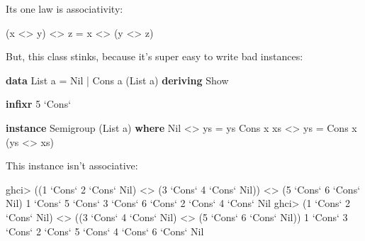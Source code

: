 \documentclass[]{article}
\newenvironment{Shaded}{\begin{snugshade}}{\end{snugshade}}
\newcommand{\DataTypeTok}[1]{\textcolor[rgb]{0.13,0.29,0.53}{#1}}
\newcommand{\DecValTok}[1]{\textcolor[rgb]{0.00,0.00,0.81}{#1}}
\newcommand{\FunctionTok}[1]{\textcolor[rgb]{0.00,0.00,0.00}{#1}}
\newcommand{\KeywordTok}[1]{\textcolor[rgb]{0.13,0.29,0.53}{\textbf{#1}}}
\newcommand{\NormalTok}[1]{#1}
\newcommand{\OtherTok}[1]{\textcolor[rgb]{0.56,0.35,0.01}{#1}}
\begin{document}
Its one law is associativity:

\begin{Shaded}
\begin{Highlighting}[]
\NormalTok{(x }\FunctionTok{<>}\NormalTok{ y) }\FunctionTok{<>}\NormalTok{ z }\FunctionTok{=}\NormalTok{ x }\FunctionTok{<>}\NormalTok{ (y }\FunctionTok{<>}\NormalTok{ z)}
\end{Highlighting}
\end{Shaded}

But, this class stinks, because it's super easy to write bad instances:

\begin{Shaded}
\begin{Highlighting}[]
\KeywordTok{data} \DataTypeTok{List}\NormalTok{ a }\FunctionTok{=} \DataTypeTok{Nil} \FunctionTok{|} \DataTypeTok{Cons}\NormalTok{ a (}\DataTypeTok{List}\NormalTok{ a)}
    \KeywordTok{deriving} \DataTypeTok{Show}

\KeywordTok{infixr} \DecValTok{5} \OtherTok{`Cons`}

\KeywordTok{instance} \DataTypeTok{Semigroup}\NormalTok{ (}\DataTypeTok{List}\NormalTok{ a) }\KeywordTok{where}
    \DataTypeTok{Nil}       \FunctionTok{<>}\NormalTok{ ys }\FunctionTok{=}\NormalTok{ ys}
    \DataTypeTok{Cons}\NormalTok{ x xs }\FunctionTok{<>}\NormalTok{ ys }\FunctionTok{=} \DataTypeTok{Cons}\NormalTok{ x (ys }\FunctionTok{<>}\NormalTok{ xs)}
\end{Highlighting}
\end{Shaded}

This instance isn't associative:

\begin{Shaded}
\begin{Highlighting}[]
\NormalTok{ghci}\FunctionTok{>}\NormalTok{ ((}\DecValTok{1} \OtherTok{`Cons`} \DecValTok{2} \OtherTok{`Cons`} \DataTypeTok{Nil}\NormalTok{) }\FunctionTok{<>}\NormalTok{ (}\DecValTok{3} \OtherTok{`Cons`} \DecValTok{4} \OtherTok{`Cons`} \DataTypeTok{Nil}\NormalTok{)) }\FunctionTok{<>}\NormalTok{ (}\DecValTok{5} \OtherTok{`Cons`} \DecValTok{6} \OtherTok{`Cons`} \DataTypeTok{Nil}\NormalTok{)}
\DecValTok{1} \OtherTok{`Cons`} \DecValTok{5} \OtherTok{`Cons`} \DecValTok{3} \OtherTok{`Cons`} \DecValTok{6} \OtherTok{`Cons`} \DecValTok{2} \OtherTok{`Cons`} \DecValTok{4} \OtherTok{`Cons`} \DataTypeTok{Nil}
\NormalTok{ghci}\FunctionTok{>}\NormalTok{ (}\DecValTok{1} \OtherTok{`Cons`} \DecValTok{2} \OtherTok{`Cons`} \DataTypeTok{Nil}\NormalTok{) }\FunctionTok{<>}\NormalTok{ ((}\DecValTok{3} \OtherTok{`Cons`} \DecValTok{4} \OtherTok{`Cons`} \DataTypeTok{Nil}\NormalTok{) }\FunctionTok{<>}\NormalTok{ (}\DecValTok{5} \OtherTok{`Cons`} \DecValTok{6} \OtherTok{`Cons`} \DataTypeTok{Nil}\NormalTok{))}
\DecValTok{1} \OtherTok{`Cons`} \DecValTok{3} \OtherTok{`Cons`} \DecValTok{2} \OtherTok{`Cons`} \DecValTok{5} \OtherTok{`Cons`} \DecValTok{4} \OtherTok{`Cons`} \DecValTok{6} \OtherTok{`Cons`} \DataTypeTok{Nil}
\end{Highlighting}
\end{Shaded}
\end{document}

